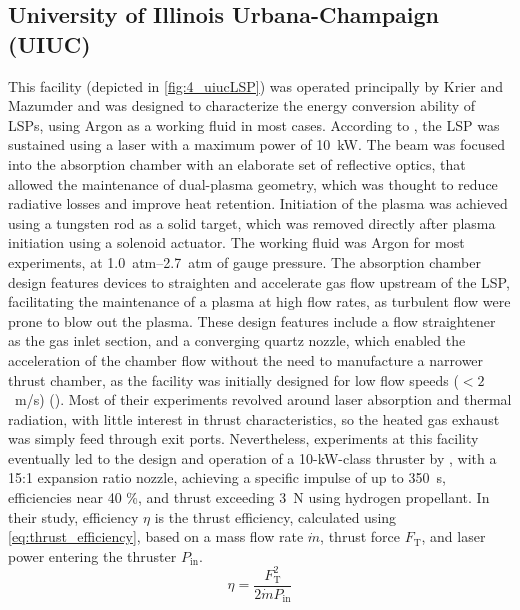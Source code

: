         \subsection{University of Illinois Urbana-Champaign (UIUC)}
            This facility (depicted in \autoref{fig:4_uiucLSP}) was operated principally by Krier and Mazumder and was designed to characterize the energy conversion ability of LSPs, using Argon as a working fluid in most cases. According to \textcite{schwartzLasersustainedGasPlasmas1989}, the LSP was sustained using a  laser with a maximum power of \qty{10}{kW}. The beam was focused into the absorption chamber with an elaborate set of reflective optics, that allowed the maintenance of dual-plasma geometry, which was thought to reduce radiative losses and improve heat retention. Initiation of the plasma was achieved using a tungsten rod as a solid target, which was removed directly after plasma initiation using a solenoid actuator. The working fluid was Argon for most experiments, at \qtyrange{1.0}{2.7}{atm} of gauge pressure. The absorption chamber design features devices to straighten and accelerate gas flow upstream of the LSP, facilitating the maintenance of a plasma at high flow rates, as turbulent flow were prone to blow out the plasma. These design features include a flow straightener as the gas inlet section, and a converging quartz nozzle, which enabled the acceleration of the chamber flow without the need to manufacture a narrower thrust chamber, as the facility was initially designed for low flow speeds ($< 2$~m/s) (\textcite{krierEnergyConversionMeasurements1988}). Most of their experiments revolved around laser absorption and thermal radiation, with little interest in thrust characteristics, so the heated gas exhaust was simply feed through exit ports. Nevertheless, experiments at this facility eventually led to the design and operation of a 10-kW-class thruster by \textcite{blackLaserPropulsion10kW1995}, with a 15:1 expansion ratio nozzle, achieving a specific impulse of up to 350~s, efficiencies near 40 \%, and thrust exceeding 3~N using hydrogen propellant. In their study, efficiency $\eta$ is the thrust efficiency, calculated using \autoref{eq:thrust_efficiency}, based on a mass flow rate $\dot{m}$, thrust force $F_\mathrm{T}$, and laser power entering the thruster $P_\mathrm{in}$.
            \begin{equation} \label{eq:thrust_efficiency}
                \eta = \frac{F_\mathrm{T}^2}{2\dot{m}P_\mathrm{in}}
            \end{equation}
